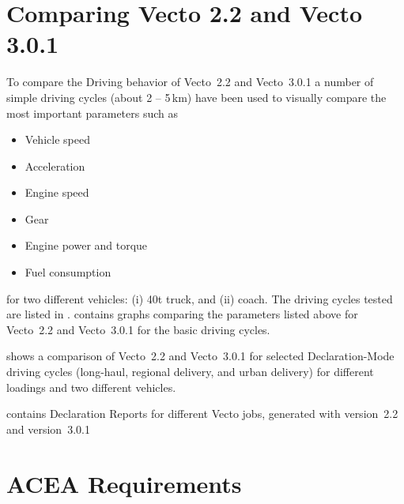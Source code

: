 
\section{Comparing Vecto 2.2 and Vecto 3.0.1} %
\label{sec:comparison_of_vecto_2_2_and_vecto_3_0_1}

To compare the Driving behavior of Vecto~2.2 and Vecto~3.0.1 a number of simple driving cycles (about 2 -- 5\,km) have been used to visually compare the most important parameters such as 
\begin{itemize}
	\item Vehicle speed
	\item Acceleration
	\item Engine speed
	\item Gear
	\item Engine power and torque
	\item Fuel consumption
\end{itemize}
for two different vehicles: (i) 40t truck, and (ii) coach. The driving cycles tested are listed in .  contains graphs comparing the parameters listed above for Vecto~2.2 and Vecto~3.0.1 for the basic driving cycles.

 shows a comparison of Vecto~2.2 and Vecto~3.0.1 for selected Declaration-Mode driving cycles (long-haul, regional delivery, and urban delivery) for different loadings and two different vehicles.

 contains Declaration Reports for different Vecto jobs, generated with version~2.2 and version~3.0.1



\section{ACEA Requirements} %
\label{sec:subsection_name}


